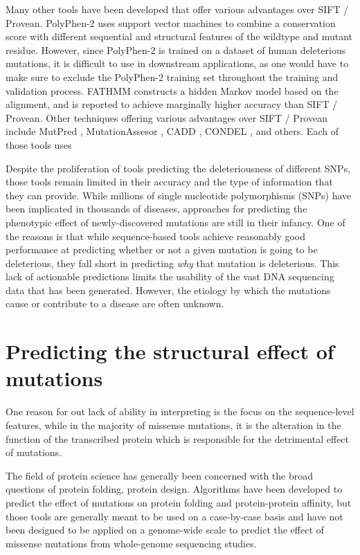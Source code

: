 Many other tools have been developed that offer various advantages over SIFT / Provean. PolyPhen-2 \cite{adzhubei_predicting_2001} uses support vector machines to combine a conservation score with different sequential and structural features of the wildtype and mutant residue. However, since PolyPhen-2 is trained on a dataset of human deleterious mutations, it is difficult to use in downstream applications, as one would have to make sure to exclude the PolyPhen-2 training set throughout the training and validation process. FATHMM \cite{shihab_ranking_2014} constructs a hidden Markov model based on the alignment, and is reported to achieve marginally higher accuracy than SIFT / Provean. Other techniques offering various advantages over SIFT / Provean include MutPred \cite{li_automated_2009}, MutationAssesor \cite{network_integrated_2011}, CADD \cite{kircher_general_2014}, CONDEL \cite{choi_predicting_2012}, and others. Each of those tools uses

Despite the proliferation of tools predicting the deleteriousness of different SNPs, those tools remain limited in their accuracy and the type of information that they can provide. While millions of single nucleotide polymorphisms (SNPs) have been implicated in thousands of diseases, approaches for predicting the phenotypic effect of newly-discovered mutations are still in their infancy. One of the reasons is that while sequence-based tools achieve reasonably good performance at predicting whether or not a given mutation is going to be deleterious, they fall short in predicting \textit{why} that mutation is deleterious. This lack of actionable predictions limits the usability of the vast DNA sequencing data that has been generated. However, the etiology by which the mutations cause or contribute to a disease are often unknown.



\section{Predicting the structural effect of mutations}

One reason for out lack of ability in interpreting is the focus on the sequence-level features, while in the majority of missense mutations, it is the alteration in the function of the transcribed protein which is responsible for the detrimental effect of mutations.

The field of protein science has generally been concerned with the broad questions of protein folding, protein design. Algorithms have been developed to predict the effect of mutations on protein folding and protein-protein affinity, but those tools are generally meant to be used on a case-by-case basis and have not been designed to be applied on a genome-wide scale to predict the effect of missense mutations from whole-genome sequencing studies.

